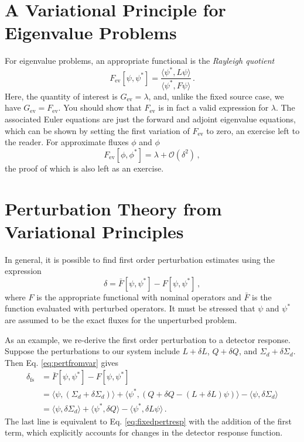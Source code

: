 \section*{A Variational Principle for Eigenvalue Problems}

For eigenvalue problems, an appropriate functional is 
the \textit{Rayleigh quotient}
\begin{equation}
 F_{\text{ev}}[\psi,\psi^*] = 
   \frac{\langle \psi^*,L\psi \rangle}{ \langle \psi^*, F \psi \rangle } \, .
 \label{eq:rayleigh}
\end{equation}
Here, the quantity of interest is $G_{\text{ev}} = \lambda$, and, unlike the 
fixed source case, we have $G_{\text{ev}} = F_{\text{ev}}$.  You should show 
that $F_{\text{ev}}$ is in fact a valid expression for $\lambda$.  The 
associated Euler equations are just the forward and adjoint eigenvalue 
equations, which can be shown by setting the first variation 
of $F_{\text{ev}}$ to zero, an exercise left to the reader.
For approximate fluxes $\phi$ and $\phi$
\begin{equation}
 F_{\text{ev}}[\phi,\phi^*] = \lambda + \mathcal{O}(\delta^2) \, ,
\end{equation}
the proof of which is also left as an exercise.

\section*{Perturbation Theory from Variational Principles}

In general, it is possible to find first order perturbation estimates using 
the expression
\begin{equation}
 \delta = \bar{F}[\psi,\psi^*] - F[\psi,\psi^*] \, ,
 \label{eq:pertfromvar}
\end{equation}
where $F$ is the appropriate functional with nominal operators 
and $\bar{F}$ is the function evaluated with perturbed operators.  It must 
be stressed that $\psi$ and $\psi^*$ are assumed to be the exact fluxes for 
the unperturbed problem.

As an example, we re-derive the first order perturbation to a detector 
response.  Suppose the perturbations to our system 
include $L+\delta L$, $Q+\delta Q$, 
and $\Sigma_d + \delta \Sigma_d$.  Then Eq. \ref{eq:pertfromvar}  gives
\begin{equation}
\begin{split}
 \delta_{\text{fs}} &= \bar{F}[\psi,\psi^*] - F[\psi,\psi^*] \\
        &= \langle \psi, (\Sigma_d+\delta \Sigma_d) \rangle + 
           \langle \psi^*,(Q+\delta Q-(L+\delta L)\psi ) \rangle - 
           \langle \psi, \delta \Sigma_d \rangle \\
        &= \langle \psi,\delta \Sigma_d \rangle + 
           \langle \psi^* , \delta Q \rangle - 
           \langle \psi^*,\delta L \psi \rangle \, .
\end{split}
\label{eq:fixedpertvar}
\end{equation}
The last line is equivalent to Eq. \ref{eq:fixedpertresp} with the addition 
of the first term, which explicitly accounts for changes in the detector 
response function.

